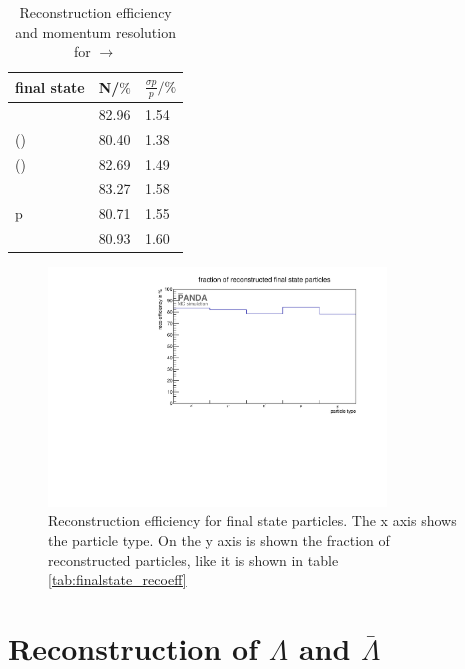 	\begin{table}
		\centering
		\caption{\propose Reconstruction efficiency and momentum resolution for \pbarpSystem $\rightarrow$ \excitedanticascade \cascade}
		\label{tab:finalstate_recoeff_cc}
		\begin{tabular}{lll}
			\hline
			final state & N/$\%$ & $\frac{\sigma p}{p}/\%$ \\
			\hline
			\hline
			\piplus &  82.96&   1.54\\
			\piminusone(\cascade) & 80.40&   1.38  \\
			\piminustwo(\lam) &  82.69&   1.49\\
			\kplus& 83.27&   1.58 \\
			p &  80.71&   1.55\\
			\antiproton &  80.93&   1.60\\\hline
			 
		\end{tabular}
	\end{table}
	
	\begin{figure}
	
		\centering
		\includegraphics[width=0.8\textwidth]{./plots/finalstate/reco_efficiency.pdf}
		\caption{\propose Reconstruction efficiency for final state particles. The x axis shows the particle type. 
				On the y axis is shown the fraction of reconstructed particles, like it is shown in table \ref{tab:finalstate_recoeff}}
		\label{fig:finalstate_recoeff}
	
	\end{figure}
	

	
\section{Reconstruction of $\Lambda$ and $\bar{\Lambda}$}
